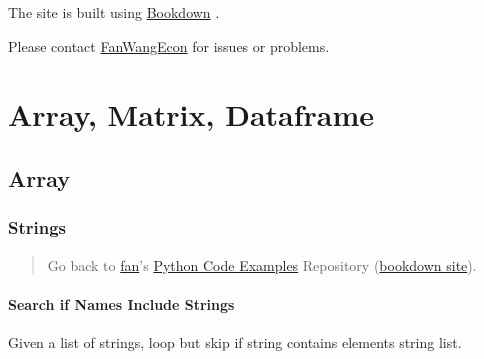 \documentclass[
]{book}
\begin{document}
The site is built using \href{https://bookdown.org/}{Bookdown} \citep{R-bookdown}.

Please contact \href{https://fanwangecon.github.io/}{FanWangEcon} for issues or problems.

\hypertarget{array-matrix-dataframe}{%
\chapter{Array, Matrix, Dataframe}\label{array-matrix-dataframe}}

\hypertarget{array}{%
\section{Array}\label{array}}

\hypertarget{strings}{%
\subsection{Strings}\label{strings}}

\begin{quote}
Go back to \href{http://fanwangecon.github.io/}{fan}'s \href{https://fanwangecon.github.io/pyfan/}{Python Code Examples} Repository (\href{https://fanwangecon.github.io/pyfan/bookdown}{bookdown site}).
\end{quote}

\hypertarget{search-if-names-include-strings}{%
\subsubsection{Search if Names Include Strings}\label{search-if-names-include-strings}}

Given a list of strings, loop but skip if string contains elements string list.
\end{document}
